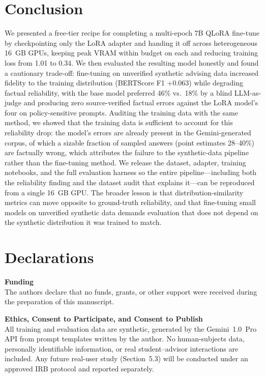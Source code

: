 \documentclass[11pt, a4paper]{article}
\begin{document}
\section{Conclusion}
We presented a free-tier recipe for completing a multi-epoch 7B QLoRA fine-tune by checkpointing only the LoRA adapter and handing it off across heterogeneous 16~GB GPUs, keeping peak VRAM within budget on each and reducing training loss from 1.01 to 0.34. We then evaluated the resulting model honestly and found a cautionary trade-off: fine-tuning on unverified synthetic advising data increased fidelity to the training distribution (BERTScore F1 $+0.063$) while degrading factual reliability, with the base model preferred 46\% vs.\ 18\% by a blind LLM-as-judge and producing zero source-verified factual errors against the LoRA model's four on policy-sensitive prompts. Auditing the training data with the same method, we showed that the training data is sufficient to account for this reliability drop: the model's errors are already present in the Gemini-generated corpus, of which a sizable fraction of sampled answers (point estimates 28--40\%) are factually wrong, which attributes the failure to the synthetic-data pipeline rather than the fine-tuning method. We release the dataset, adapter, training notebooks, and the full evaluation harness so the entire pipeline---including both the reliability finding and the dataset audit that explains it---can be reproduced from a single 16~GB GPU. The broader lesson is that distribution-similarity metrics can move opposite to ground-truth reliability, and that fine-tuning small models on unverified synthetic data demands evaluation that does not depend on the synthetic distribution it was trained to match.

\section*{Declarations}

\textbf{Funding} \\
The authors declare that no funds, grants, or other support were received during the preparation of this manuscript.

\textbf{Ethics, Consent to Participate, and Consent to Publish} \\
All training and evaluation data are synthetic, generated by the Gemini~1.0~Pro API from prompt templates written by the author. No human-subjects data, personally identifiable information, or real student--advisor interactions are included. Any future real-user study (Section~5.3) will be conducted under an approved IRB protocol and reported separately.
\end{document}

